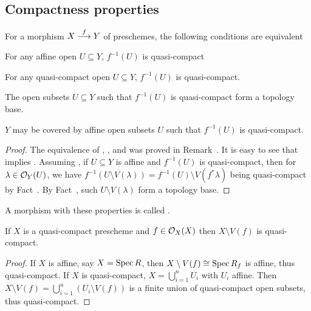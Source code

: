 \documentclass[a4paper,parskip=half,numbers=enddot, DIV=12]{scrreprt}
\begin{document}
\subsection{Compactness properties}
\begin{fact}
    For a morphism $X\morphism[f] Y$ of preschemes, the following conditions are equivalent
    \begin{alphanumerate}
    \item 
        For any affine open $U\subseteq Y$, $f^{-1}(U)$ is quasi-compact
    \item 
        For any quasi-compact open $U\subseteq Y$, $f^{-1}(U)$ is quasi-compact.
    \item 
        The open subsets $U\subseteq Y$ such that $f^{-1}(U)$ is quasi-compact form a topology base.
    \item 
        $Y$ may be covered by affine open subsets $U$ such that $f^{-1}(U)$ is quasi-compact.
    \end{alphanumerate}
\end{fact}
\begin{proof}
	The equivalence of , , and  was proved in Remark~. It is easy to see that  implies . Assuming , if $U\subseteq Y$ is affine and $f^{-1}(U)$ is quasi-compact, then for $\lambda\in \mathcal{O}_Y(U)$, we have $f^{-1}(U\setminus V(\lambda)) = f^{-1}(U) \setminus  V(f^*\lambda)$ being quasi-compact by Fact~. By Fact~, such $U\setminus V(\lambda)$ form a topology base.
\end{proof}
\begin{defi} 
    A morphism with these properties is called .
\end{defi}
\begin{fact}
    If $X$ is a quasi-compact prescheme and $f\in \mathcal{O}_X(X)$ then $X\setminus V(f)$ is quasi-compact.
\end{fact}
\begin{proof}
    If $X$ is affine, say $X=\operatorname{Spec} R$, then $X\setminus V(f) \cong \operatorname{Spec} R_f$ is affine, thus quasi-compact. If $X$ is quasi-compact, $X=\bigcup_{i=1}^n U_i$ with $U_i$ affine. Then $X\setminus V(f) = \bigcup_{i=1}^n(U_i\setminus V(f))$ is a finite union of quasi-compact open subsets, thus quasi-compact.
\end{proof}
\end{document}
